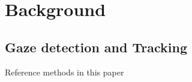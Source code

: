 \section{Background}
\subsection{Gaze detection and Tracking}

Reference methods in this paper\cite{chennamma2013survey}